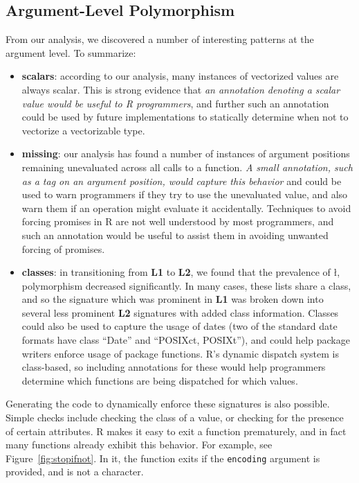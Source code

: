 \documentclass[acmsmall,10pt,review,anonymous]{acmart}\settopmatter{printfolios=true,printccs=false,printacmref=false}
\begin{document}
%
%
%
%
\subsection{Argument-Level Polymorphism}

From our analysis, we discovered a number of interesting patterns at the argument level.
To summarize:

\begin{itemize}

	\item {\bf scalars}: according to our analysis, many instances of vectorized values are always scalar.
	This is strong evidence that {\it an annotation denoting a scalar value would be useful to R programmers}, and further such an annotation could be used by future implementations to statically determine when not to vectorize a vectorizable type.
	
	\item {\bf missing}: our analysis has found a number of instances of argument positions remaining unevaluated across all calls to a function.
	{\it A small annotation, such as a tag on an argument position, would capture this behavior} and could be used to warn programmers if they try to use the unevaluated value, and also warn them if an operation might evaluate it accidentally.
	Techniques to avoid forcing promises in R are not well understood by most programmers, and such an annotation would be useful to assist them in avoiding unwanted forcing of promises.

	\item {\bf classes}: in transitioning from {\bf L1} to {\bf L2}, we found that the prevalence of \l,  polymorphism decreased significantly.
	In many cases, these lists share a class, and so the signature which was prominent in {\bf L1} was broken down into several less prominent {\bf L2} signatures with added class information.
	Classes could also be used to capture the usage of dates (two of the standard date formats have class ``Date'' and ``POSIXct, POSIXt''), and could help package writers enforce usage of package functions.
	R's dynamic dispatch system is class-based, so including annotations for these would help programmers determine which functions are being dispatched for which values.

\end{itemize}

Generating the code to dynamically enforce these signatures is also possible.
Simple checks include checking the class of a value, or checking for the presence of certain attributes.
R makes it easy to exit a function prematurely, and in fact many functions already exhibit this behavior.
For example, see Figure~\ref{fig:stopifnot}.
In it, the function exits if the {\tt encoding} argument is provided, and is not a character.
\end{document}
